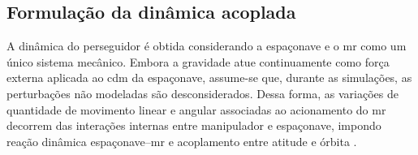 \subsection{Formulação da dinâmica acoplada}
\label{sec:dinAcoplada_}

A dinâmica do perseguidor é obtida considerando a espaçonave e o \gls{mr} como um único sistema mecânico.
Embora a gravidade atue continuamente como força externa aplicada ao \gls{cdm} da espaçonave, assume-se que, durante as simulações, as perturbações não modeladas são desconsiderados.
Dessa forma, as variações de quantidade de movimento linear e angular associadas ao acionamento do \gls{mr} decorrem das interações internas entre manipulador e espaçonave, impondo reação dinâmica espaçonave--\gls{mr} e acoplamento entre atitude e órbita \cite{Wilde2018}.

